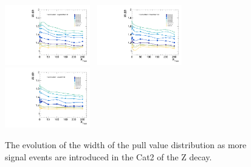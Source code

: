 \begin{figure}[!ht]
  \includegraphics[width=0.33\textwidth]{Fig/BiasStudy/Linearity/ZJpsiG_Cat2/pull_width_linearity_TrueFunc6}~
  \includegraphics[width=0.33\textwidth]{Fig/BiasStudy/Linearity/ZJpsiG_Cat2/pull_width_linearity_TrueFunc7}~
  \includegraphics[width=0.33\textwidth]{Fig/BiasStudy/Linearity/ZJpsiG_Cat2/pull_width_linearity_TrueFunc8}\\
  \caption{The evolution of the width of the pull value distribution as more signal events are introduced in the Cat2 of the Z decay.}
  \label{fig:Linearity_width_ZJpsiG_Cat2}
\end{figure}
\clearpage

